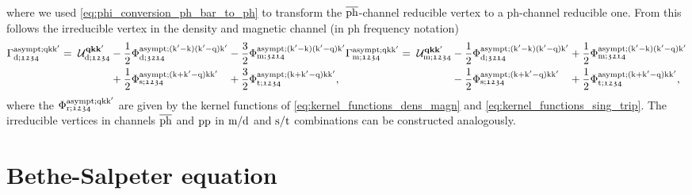 \documentclass[../../main.tex]{subfiles}
\begin{document}
where we used \eqref{eq:phi_conversion_ph_bar_to_ph} to transform the $\overline{\text{ph}}$-channel reducible vertex to a ph-channel reducible one. From this follows the irreducible vertex in the density and magnetic channel (in ph frequency notation) \cite{efficient BSE}
\begin{subequations}
\begin{equation}
\begin{alignedat}{3}
	\Gamma^{\asympt;\q\k\kp}_{\dens;\mathfrak{1234}}&=\;\mathcal{U}^{\vv{qkk}'}_{\dens;\mathfrak{1234}}&&-\frac12\Phi^{\asympt;(\kp-\k)(\kp-\q)\kp}_{\dens;\mathfrak{3214}}&&-\frac32\Phi^{\asympt;(\kp-\k)(\kp-\q)\kp}_{\magn;\mathfrak{3214}}\\
	&&&+\frac12\Phi_{\sing;\mathfrak{1234}}^{\asympt;(\k+\kp-\q)\k\kp}&&+\frac32\Phi_{\trip;\mathfrak{1234}}^{\asympt;(\k+\kp-\q)\k\kp},
\end{alignedat}
\end{equation}\\[-0.6cm]%
\begin{equation}
\begin{alignedat}{3}
	\Gamma^{\asympt;\q\k\kp}_{\magn;\mathfrak{1234}}&=\;\mathcal{U}^{\vv{qkk}'}_{\magn;\mathfrak{1234}} &&-\frac12\Phi^{\asympt;(\kp-\k)(\kp-\q)\kp}_{\dens;\mathfrak{3214}}&&+\frac12\Phi^{\asympt;(\kp-\k)(\kp-\q)\kp}_{\magn;\mathfrak{3214}}\\
	&&&-\frac12\Phi_{\sing;\mathfrak{1234}}^{\asympt;(\k+\kp-\q)\k\kp}&&+\frac12\Phi_{\trip;\mathfrak{1234}}^{\asympt;(\k+\kp-\q)\k\kp},
\end{alignedat}
\end{equation}
\end{subequations}
where the $\Phi_{\text{r};\mathfrak{1234}}^{\text{asympt};\text{q}\text{k}\text{k}'}$ are given by the kernel functions of \eqref{eq:kernel_functions_dens_magn} and \eqref{eq:kernel_functions_sing_trip}. The irreducible vertices in channels $\overline{\text{ph}}$ and $\text{pp}$ in $\text{m}/\text{d}$ and $\text{s}/\text{t}$ combinations can be constructed analogously.

\section{Bethe-Salpeter equation}\label{sec:bethe_salpeter}
\end{document}
